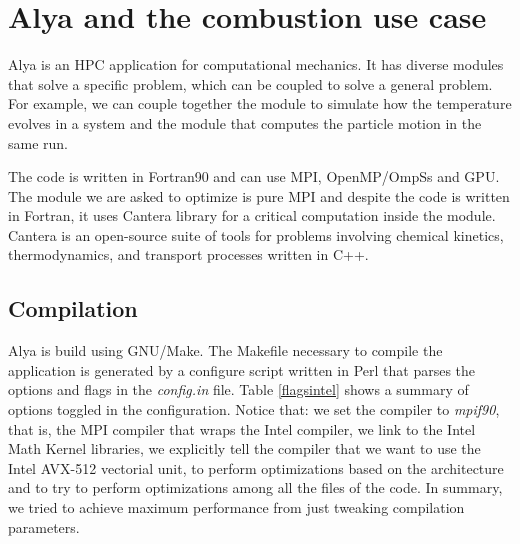 \section{Alya and the combustion use case}
Alya is an HPC application for computational mechanics. It has diverse modules that solve a specific problem, which can be coupled to solve a general problem. For example, we can couple together the module to simulate how the temperature evolves in a system and the module that computes the particle motion in the same run. 

The code is written in Fortran90 and can use MPI, OpenMP/OmpSs and GPU. The module we are asked to optimize is pure MPI and despite the code is written in Fortran, it uses Cantera library for a critical computation inside the module. Cantera\cite{cantera} is an open-source suite of tools for problems involving chemical kinetics, thermodynamics, and transport processes written in C++.

\subsection{Compilation}

Alya is build using GNU/Make\cite{gnumake}. The Makefile necessary to compile the application is generated by a configure script written in Perl that parses the options and flags in the \textit{config.in} file. Table \ref{flagsintel} shows a summary of options toggled in the configuration. Notice that: we set the compiler to \textit{mpif90}, that is, the MPI compiler that wraps the Intel compiler,  we link to the Intel Math Kernel libraries\cite{intelmkl}, we explicitly tell the compiler that we want to use the Intel AVX-512 vectorial unit, to perform optimizations based on the architecture and to try to perform optimizations among all the files of the code.  In summary, we tried to achieve maximum performance from just tweaking compilation parameters.

